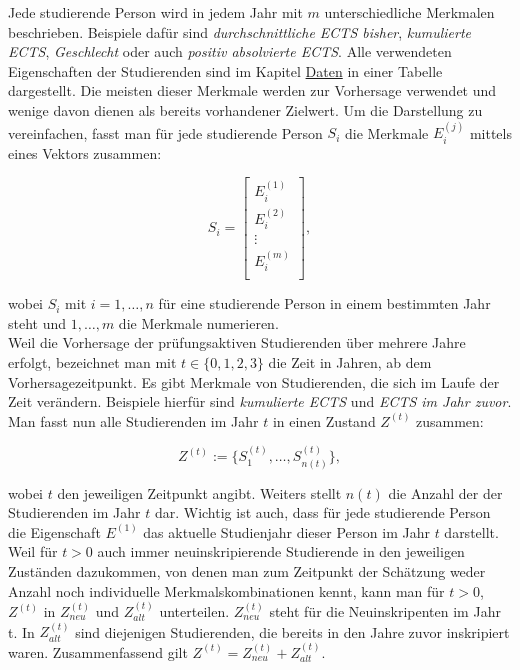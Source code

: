 Jede studierende Person wird in jedem Jahr mit $m$ unterschiedliche Merkmalen beschrieben. Beispiele daf\"ur sind \textit{\glqq durchschnittliche ECTS bisher\grqq{}}, 
\textit{\glqq kumulierte ECTS\grqq{}}, \textit{\glqq Geschlecht\grqq{}} oder auch \textit{\glqq positiv absolvierte ECTS\grqq{}}. Alle verwendeten Eigenschaften der 
Studierenden sind im Kapitel \hyperref[sec:daten]{Daten} in einer Tabelle dargestellt. Die meisten dieser Merkmale werden zur 
Vorhersage verwendet und wenige davon dienen als bereits vorhandener Zielwert. Um die Darstellung zu vereinfachen, fasst man f\"ur 
jede studierende Person $S_i$ die Merkmale $E_i^{(j)}$ mittels eines Vektors zusammen: 

$$S_i = \begin{bmatrix}
    E_i^{(1)}\\
    E_i^{(2)}\\
    \vdots \\
    E_i^{(m)}\\
\end{bmatrix}, $$

wobei $S_i$ mit $i = 1,\dots,n$ f\"ur eine studierende Person in einem bestimmten Jahr steht und $1,\dots,m$ die Merkmale numerieren. \\

Weil die Vorhersage der pr\"ufungsaktiven Studierenden \"uber mehrere Jahre erfolgt, bezeichnet man 
mit $t \in \{0,1,2,3\}$ die Zeit in Jahren, ab dem Vorhersagezeitpunkt. Es gibt Merkmale von Studierenden, die sich im Laufe der Zeit 
ver\"andern. Beispiele hierf\"ur sind \textit{\glqq kumulierte ECTS\grqq{}} und \textit{\glqq ECTS im Jahr zuvor\grqq{}}. Man fasst nun alle 
Studierenden im Jahr $t$ in einen Zustand $Z^{(t)}$ zusammen:

$$Z^{(t)} := \{S_1^{(t)}, \dots ,S_{n(t)}^{(t)}\},$$

wobei $t$ den jeweiligen Zeitpunkt angibt. Weiters stellt $n(t)$ die Anzahl der der Studierenden im 
Jahr $t$ dar. Wichtig ist auch, dass f\"ur jede studierende Person die Eigenschaft $E^{(1)}$ das aktuelle Studienjahr 
dieser Person im Jahr $t$ darstellt. \\



Weil für $t>0$ auch immer neuinskripierende Studierende in den jeweiligen Zuständen dazukommen, von denen man zum Zeitpunkt der Sch\"atzung weder 
Anzahl noch individuelle Merkmalskombinationen kennt, kann man für $t>0$, $Z^{(t)}$ in $Z_{neu}^{(t)}$ und $Z_{alt}^{(t)}$ unterteilen. 
$Z_{neu}^{(t)}$ steht f\"ur die Neuinskripenten im Jahr t. 
In $Z_{alt}^{(t)}$ sind diejenigen Studierenden, die bereits in den Jahre zuvor inskripiert waren.
Zusammenfassend gilt $Z^{(t)} = Z_{neu}^{(t)} + Z_{alt}^{(t)}$.  \\

